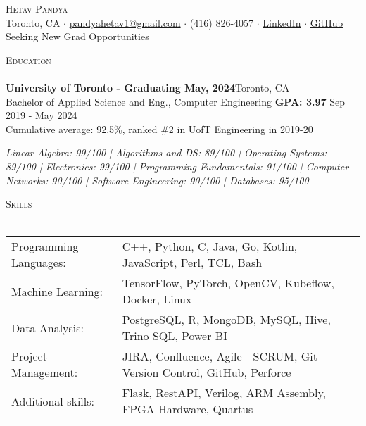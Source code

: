\documentclass[a4paper]{article}
\newcommand{\lineunder} {
    \vspace*{-8pt} \\
    \hspace*{-18pt} \hrulefill \\
}
\newcommand{\header} [1] {
    {\hspace*{-18pt}\vspace*{6pt} \textsc{#1}}
    \vspace*{-6pt} \lineunder
}
\begin{document}
\vspace*{-40pt}



\vspace*{-10pt}
\begin{center}
	{\Huge \scshape {Hetav Pandya}}\\
	Toronto, CA $\cdot$ \href{mailto:pandyahetav1@gmail.com}{pandyahetav1@gmail.com} $\cdot$ (416) 826-4057 $\cdot$ \href{https://www.linkedin.com/in/hetav-pandya}{LinkedIn} $\cdot$ \href{https://github.com/pandyah5}{GitHub}\\
    Seeking New Grad Opportunities
\end{center}

\header{Education}
\textbf{University of Toronto - Graduating May, 2024}\hfill Toronto, CA\\
Bachelor of Applied Science and Eng., Computer Engineering \textbf{GPA: 3.97} \hfill Sep 2019 - May 2024\\
Cumulative average: 92.5\%, ranked \#2 in UofT Engineering in 2019-20
\linebreak\\
\begin{footnotesize}
\textit{Linear Algebra: 99/100 | Algorithms and DS: 89/100 | Operating Systems: 89/100 | Electronics: 99/100 | 
 Programming Fundamentals: 91/100 | Computer Networks: 90/100 | Software Engineering: 90/100 | Databases: 95/100}
\end{footnotesize}
\vspace{2mm}

\header{Skills}
\begin{tabular}{ l l }
	Programming Languages: & C++, Python, C, Java, Go, Kotlin, JavaScript, Perl, TCL, Bash             \\
	Machine Learning:      & TensorFlow, PyTorch, OpenCV, Kubeflow, Docker, Linux             \\
	Data Analysis:         & PostgreSQL, R, MongoDB, MySQL, Hive, Trino SQL, Power BI            \\
	Project Management:    & JIRA, Confluence, Agile - SCRUM, Git Version Control, GitHub, Perforce           \\
    Additional skills:     & Flask, RestAPI, Verilog, ARM Assembly, FPGA Hardware, Quartus                      \\                               
\end{tabular}
\vspace{2mm}
\end{document}
